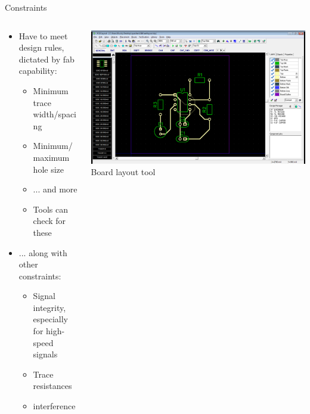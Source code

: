 \documentclass{beamer}
\begin{document}
\begin{frame}{Constraints}
  \begin{columns}[T]
    \begin{column}{.6\textwidth}
      \begin{itemize}
        \item Have to meet design rules, dictated by fab capability:
        \begin{itemize}
          \item Minimum trace width/spacing
          \item Minimum/maximum hole size
          \item ... and more
          \item Tools can check for these
        \end{itemize}
        \item ... along with other constraints:
        \begin{itemize}
          \item Signal integrity, especially for high-speed signals
          \item Trace resistances
          \item interference
        \end{itemize}
      \end{itemize}
    \end{column}

    \begin{column}{0.4\textwidth} \centering
      \includegraphics[width=0.9\columnwidth]{../images/diptrace/555_layout} \\
      Board layout tool
    \end{column}
  \end{columns}
\end{frame}
\end{document}
